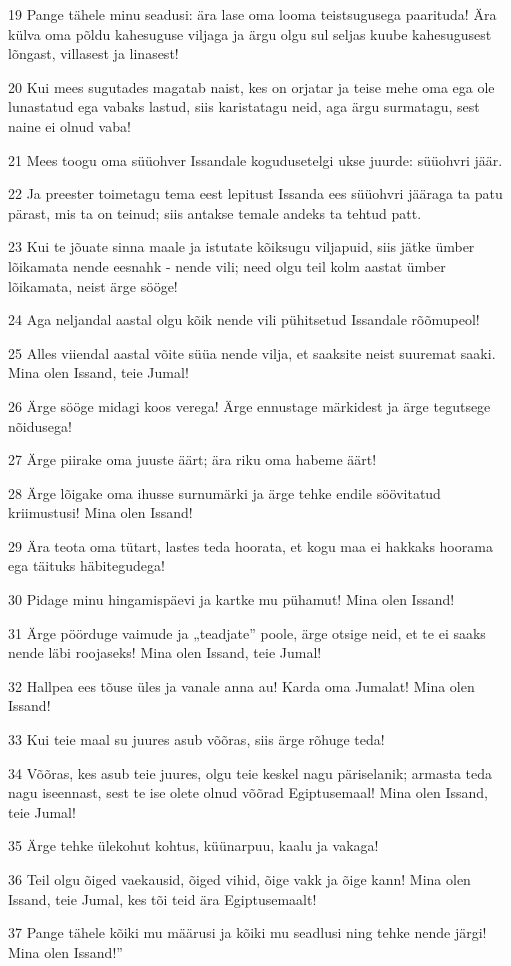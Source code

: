 \par 19 Pange tähele minu seadusi: ära lase oma looma teistsugusega paarituda! Ära külva oma põldu kahesuguse viljaga ja ärgu olgu sul seljas kuube kahesugusest lõngast, villasest ja linasest!
\par 20 Kui mees sugutades magatab naist, kes on orjatar ja teise mehe oma ega ole lunastatud ega vabaks lastud, siis karistatagu neid, aga ärgu surmatagu, sest naine ei olnud vaba!
\par 21 Mees toogu oma süüohver Issandale kogudusetelgi ukse juurde: süüohvri jäär.
\par 22 Ja preester toimetagu tema eest lepitust Issanda ees süüohvri jääraga ta patu pärast, mis ta on teinud; siis antakse temale andeks ta tehtud patt.
\par 23 Kui te jõuate sinna maale ja istutate kõiksugu viljapuid, siis jätke ümber lõikamata nende eesnahk - nende vili; need olgu teil kolm aastat ümber lõikamata, neist ärge sööge!
\par 24 Aga neljandal aastal olgu kõik nende vili pühitsetud Issandale rõõmupeol!
\par 25 Alles viiendal aastal võite süüa nende vilja, et saaksite neist suuremat saaki. Mina olen Issand, teie Jumal!
\par 26 Ärge sööge midagi koos verega! Ärge ennustage märkidest ja ärge tegutsege nõidusega!
\par 27 Ärge piirake oma juuste äärt; ära riku oma habeme äärt!
\par 28 Ärge lõigake oma ihusse surnumärki ja ärge tehke endile söövitatud kriimustusi! Mina olen Issand!
\par 29 Ära teota oma tütart, lastes teda hoorata, et kogu maa ei hakkaks hoorama ega täituks häbitegudega!
\par 30 Pidage minu hingamispäevi ja kartke mu pühamut! Mina olen Issand!
\par 31 Ärge pöörduge vaimude ja „teadjate” poole, ärge otsige neid, et te ei saaks nende läbi roojaseks! Mina olen Issand, teie Jumal!
\par 32 Hallpea ees tõuse üles ja vanale anna au! Karda oma Jumalat! Mina olen Issand!
\par 33 Kui teie maal su juures asub võõras, siis ärge rõhuge teda!
\par 34 Võõras, kes asub teie juures, olgu teie keskel nagu päriselanik; armasta teda nagu iseennast, sest te ise olete olnud võõrad Egiptusemaal! Mina olen Issand, teie Jumal!
\par 35 Ärge tehke ülekohut kohtus, küünarpuu, kaalu ja vakaga!
\par 36 Teil olgu õiged vaekausid, õiged vihid, õige vakk ja õige kann! Mina olen Issand, teie Jumal, kes tõi teid ära Egiptusemaalt!
\par 37 Pange tähele kõiki mu määrusi ja kõiki mu seadlusi ning tehke nende järgi! Mina olen Issand!”

